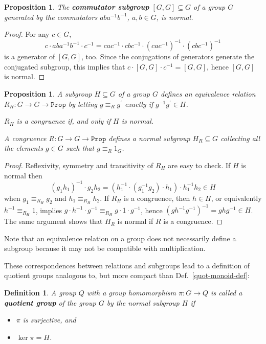 \documentclass{amsart}
\theoremstyle{plain}
\numberwithin{equation}{section} %
\numberwithin{figure}{section} %
\theoremstyle{plain}
\theoremstyle{plain}
\theoremstyle{plain}
\theoremstyle{plain}
\theoremstyle{plain}
\newtheorem{prop}[thm]{Proposition} %
\theoremstyle{plain}
\newtheorem{Def}[thm]{Definition} %
\theoremstyle{remark}
\theoremstyle{remark}
\theoremstyle{remark}
\begin{document}
\begin{prop} \label{comm-norm-prop}
The \textbf{commutator subgroup} $[G,G] \subseteq G$ of a group $G$ generated by the commutators $aba^{-1}b^{-1}$, $a, b \in G$, is normal.
\end{prop}
\begin{proof}
For any $c \in G$, 
\[ c \cdot aba^{-1}b^{-1} \cdot c^{-1} = 
   cac^{-1} \cdot cbc^{-1} \cdot (cac^{-1})^{-1} \cdot (cbc^{-1})^{-1} \]
is a generator of $[G,G]$, too. Since the conjugations of generators generate the conjugated subgroup, this implies that $c \cdot [G,G] \cdot c^{-1} = [G,G]$, hence $[G,G]$ is normal.
\end{proof}

\begin{prop}
A subgroup $H \subseteq G$ of a group $G$ defines an equivalence relation $R_H : G \rightarrow G \rightarrow \mathtt{Prop}$ by letting $g \equiv_R g^\prime$ exactly if $g^{-1}g^\prime \in H$.

$R_H$ is a congruence if, and only if $H$ is normal. 

A congruence $R : G \rightarrow G \rightarrow \mathtt{Prop}$ defines a normal subgroup $H_R \subseteq G$ collecting all the elements $g \in G$ such that $g \equiv_R 1_G$.
\end{prop}
\begin{proof}
Reflexivity, symmetry and transitivity of $R_H$ are easy to check. If $H$ is normal then 
\[ (g_1h_1)^{-1} \cdot g_2h_2 = (h_1^{-1} \cdot (g_1^{-1}g_2) \cdot h_1) \cdot h_1^{-1}h_2 \in H  \]
when $g_1 \equiv_{R_H} g_2$ and $h_1 \equiv_{R_H} h_2$. If $R_H$ is a congruence, then $h \in H$, or equivalently $h^{-1} \equiv_{R_H} 1$, implies $g \cdot h^{-1} \cdot g^{-1} \equiv_{R_H} g \cdot 1 \cdot g^{-1}$, hence $(gh^{-1}g^{-1})^{-1} = ghg^{-1} \in H$. The same argument shows that $H_R$ is normal if $R$ is a congruence.
\end{proof}

Note that an equivalence relation on a group does not necessarily define a subgroup because it may not be compatible with multiplication.

These correspondences between relations and subgroups lead to a definition of quotient groups analogous to, but more compact than Def.~\ref{quot-monoid-def}:
\begin{Def}  \label{quot-group-def}    %
A group $Q$ with a group homomorphism $\pi : G \rightarrow Q$ is called a \textbf{quotient group} of the group $G$ by the normal subgroup $H$ if
\begin{itemize}
\item[(i)] $\pi$ is surjective, and
\item[(ii)] $\ker \pi = H$.
\end{itemize}
\end{Def}
\end{document}
